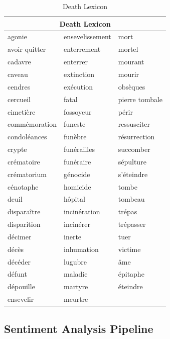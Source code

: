 \begin{table}[H]
\centering
\begin{tabular}{@{}lll@{}}
\toprule
\multicolumn{3}{c}{\textbf{Death Lexicon}}    \\ \midrule
agonie        & ensevelissement & mort           \\
avoir quitter & enterrement     & mortel         \\
cadavre       & enterrer        & mourant        \\
caveau        & extinction      & mourir         \\
cendres       & exécution       & obsèques       \\
cercueil      & fatal           & pierre tombale \\
cimetière     & fossoyeur       & périr          \\
commémoration & funeste         & ressusciter    \\
condoléances  & funèbre         & résurrection   \\
crypte        & funérailles     & succomber      \\
crématoire    & funéraire       & sépulture      \\
crématorium   & génocide        & s’éteindre     \\
cénotaphe     & homicide        & tombe          \\
deuil         & hôpital         & tombeau        \\
disparaître   & incinération    & trépas         \\
disparition   & incinérer       & trépasser      \\
décimer       & inerte          & tuer           \\
décès         & inhumation      & victime        \\
décéder       & lugubre         & âme            \\
défunt        & maladie         & épitaphe       \\
dépouille     & martyre         & éteindre       \\
ensevelir     & meurtre         &                \\ \bottomrule
\end{tabular}
\caption{Death Lexicon}
\label{tab:death lexicon}
\end{table}
\subsection{Sentiment Analysis Pipeline}

